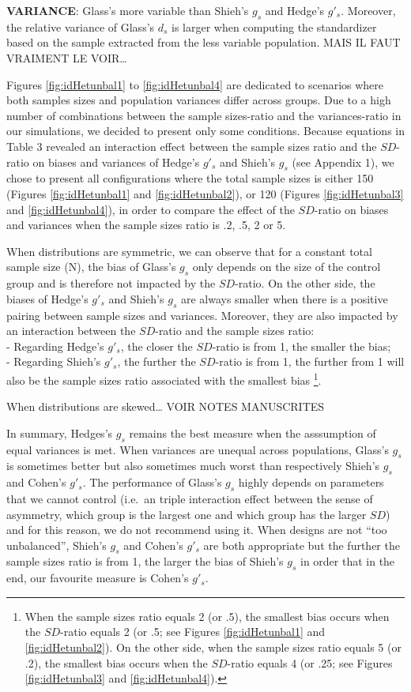 \documentclass[
  man,floatsintext]{apa6}
\begin{document}
\textbf{VARIANCE}: Glass's more variable than Shieh's \(g_s\) and Hedge's \(g'_s\). Moreover, the relative variance of Glass's \(d_s\) is larger when computing the standardizer based on the sample extracted from the less variable population. MAIS IL FAUT VRAIMENT LE VOIR\ldots{}

Figures \ref{fig:idHetunbal1} to \ref{fig:idHetunbal4} are dedicated to scenarios where both samples sizes and population variances differ across groups. Due to a high number of combinations between the sample sizes-ratio and the variances-ratio in our simulations, we decided to present only some conditions. Because equations in Table 3 revealed an interaction effect between the sample sizes ratio and the \(SD\)-ratio on biases and variances of Hedge's \(g'_s\) and Shieh's \(g_s\) (see Appendix 1), we chose to present all configurations where the total sample sizes is either 150 (Figures \ref{fig:idHetunbal1} and \ref{fig:idHetunbal2}), or 120 (Figures \ref{fig:idHetunbal3} and \ref{fig:idHetunbal4}), in order to compare the effect of the \(SD\)-ratio on biases and variances when the sample sizes ratio is .2, .5, 2 or 5.

When distributions are symmetric, we can observe that for a constant total sample size (N), the bias of Glass's \(g_s\) only depends on the size of the control group and is therefore not impacted by the \(SD\)-ratio. On the other side, the biases of Hedge's \(g'_s\) and Shieh's \(g_s\) are always smaller when there is a positive pairing between sample sizes and variances. Moreover, they are also impacted by an interaction between the \(SD\)-ratio and the sample sizes ratio:\\
- Regarding Hedge's \(g'_s\), the closer the \(SD\)-ratio is from 1, the smaller the bias;\\
- Regarding Shieh's \(g'_s\), the further the \(SD\)-ratio is from 1, the further from 1 will also be the sample sizes ratio associated with the smallest bias \footnote{When the sample sizes ratio equals 2 (or .5), the smallest bias occurs when the $SD$-ratio equals 2 (or .5; see Figures \ref{fig:idHetunbal1} and \ref{fig:idHetunbal2}). On the other side, when the sample sizes ratio equals 5 (or .2), the smallest bias occurs when the $SD$-ratio equals 4 (or .25; see Figures \ref{fig:idHetunbal3} and \ref{fig:idHetunbal4}).}.

When distributions are skewed\ldots{} VOIR NOTES MANUSCRITES

In summary, Hedges's \(g_s\) remains the best measure when the asssumption of equal variances is met. When variances are unequal across populations, Glass's \(g_s\) is sometimes better but also sometimes much worst than respectively Shieh's \(g_s\) and Cohen's \(g'_s\). The performance of Glass's \(g_s\) highly depends on parameters that we cannot control (i.e.~an triple interaction effect between the sense of asymmetry, which group is the largest one and which group has the larger \(SD\)) and for this reason, we do not recommend using it. When designs are not \enquote{too unbalanced}, Shieh's \(g_s\) and Cohen's \(g'_s\) are both appropriate but the further the sample sizes ratio is from 1, the larger the bias of Shieh's \(g_s\) in order that in the end, our favourite measure is Cohen's \(g'_s\).
\end{document}
